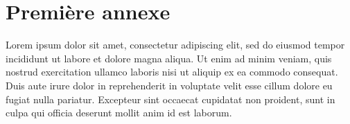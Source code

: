 \documentclass[
 reprint,
 unsortedaddress,
 preprintnumbers,
 nobibnotes,
 nofootinbib,
 longbibliography,
 amsmath,amssymb,
 aps,pra,
 onecolumn
]{revtex4-2}
\begin{document}
\appendix


\section{Première annexe}
\label{app:lorem_appendix}

Lorem ipsum dolor sit amet, consectetur adipiscing elit, sed do eiusmod tempor incididunt ut labore et dolore magna aliqua. Ut enim ad minim veniam, quis nostrud exercitation ullamco laboris nisi ut aliquip ex ea commodo consequat. Duis aute irure dolor in reprehenderit in voluptate velit esse cillum dolore eu fugiat nulla pariatur. Excepteur sint occaecat cupidatat non proident, sunt in culpa qui officia deserunt mollit anim id est laborum.
\end{document}
